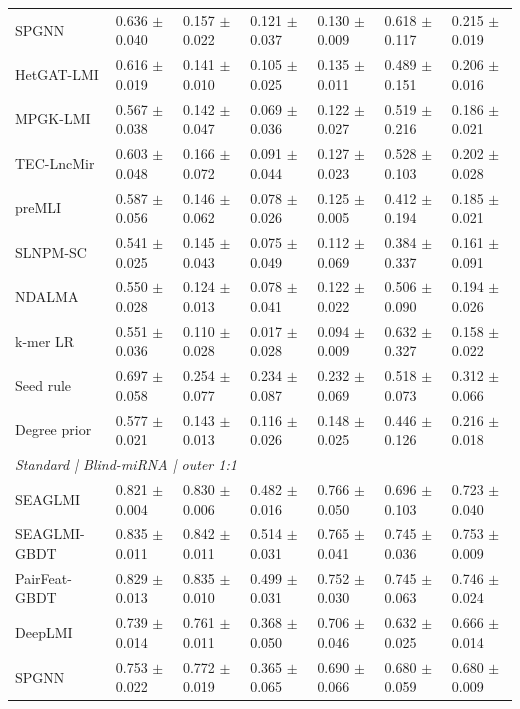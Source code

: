 \begin{landscape}
{\begin{longtable}{lllllll}
SPGNN & 0.636 $\pm$ 0.040 & 0.157 $\pm$ 0.022 & 0.121 $\pm$ 0.037 & 0.130 $\pm$ 0.009 & 0.618 $\pm$ 0.117 & 0.215 $\pm$ 0.019 \\
HetGAT-LMI & 0.616 $\pm$ 0.019 & 0.141 $\pm$ 0.010 & 0.105 $\pm$ 0.025 & 0.135 $\pm$ 0.011 & 0.489 $\pm$ 0.151 & 0.206 $\pm$ 0.016 \\
MPGK-LMI & 0.567 $\pm$ 0.038 & 0.142 $\pm$ 0.047 & 0.069 $\pm$ 0.036 & 0.122 $\pm$ 0.027 & 0.519 $\pm$ 0.216 & 0.186 $\pm$ 0.021 \\
TEC-LncMir & 0.603 $\pm$ 0.048 & 0.166 $\pm$ 0.072 & 0.091 $\pm$ 0.044 & 0.127 $\pm$ 0.023 & 0.528 $\pm$ 0.103 & 0.202 $\pm$ 0.028 \\
preMLI & 0.587 $\pm$ 0.056 & 0.146 $\pm$ 0.062 & 0.078 $\pm$ 0.026 & 0.125 $\pm$ 0.005 & 0.412 $\pm$ 0.194 & 0.185 $\pm$ 0.021 \\
SLNPM-SC & 0.541 $\pm$ 0.025 & 0.145 $\pm$ 0.043 & 0.075 $\pm$ 0.049 & 0.112 $\pm$ 0.069 & 0.384 $\pm$ 0.337 & 0.161 $\pm$ 0.091 \\
NDALMA & 0.550 $\pm$ 0.028 & 0.124 $\pm$ 0.013 & 0.078 $\pm$ 0.041 & 0.122 $\pm$ 0.022 & 0.506 $\pm$ 0.090 & 0.194 $\pm$ 0.026 \\
k-mer LR & 0.551 $\pm$ 0.036 & 0.110 $\pm$ 0.028 & 0.017 $\pm$ 0.028 & 0.094 $\pm$ 0.009 & 0.632 $\pm$ 0.327 & 0.158 $\pm$ 0.022 \\
Seed rule & 0.697 $\pm$ 0.058 & 0.254 $\pm$ 0.077 & 0.234 $\pm$ 0.087 & 0.232 $\pm$ 0.069 & 0.518 $\pm$ 0.073 & 0.312 $\pm$ 0.066 \\
Degree prior & 0.577 $\pm$ 0.021 & 0.143 $\pm$ 0.013 & 0.116 $\pm$ 0.026 & 0.148 $\pm$ 0.025 & 0.446 $\pm$ 0.126 & 0.216 $\pm$ 0.018 \\
\multicolumn{7}{l}{\textit{Standard | Blind-miRNA | outer 1:1}}\\
SEAGLMI & 0.821 $\pm$ 0.004 & 0.830 $\pm$ 0.006 & 0.482 $\pm$ 0.016 & 0.766 $\pm$ 0.050 & 0.696 $\pm$ 0.103 & 0.723 $\pm$ 0.040 \\
SEAGLMI-GBDT & 0.835 $\pm$ 0.011 & 0.842 $\pm$ 0.011 & 0.514 $\pm$ 0.031 & 0.765 $\pm$ 0.041 & 0.745 $\pm$ 0.036 & 0.753 $\pm$ 0.009 \\
PairFeat-GBDT & 0.829 $\pm$ 0.013 & 0.835 $\pm$ 0.010 & 0.499 $\pm$ 0.031 & 0.752 $\pm$ 0.030 & 0.745 $\pm$ 0.063 & 0.746 $\pm$ 0.024 \\
DeepLMI & 0.739 $\pm$ 0.014 & 0.761 $\pm$ 0.011 & 0.368 $\pm$ 0.050 & 0.706 $\pm$ 0.046 & 0.632 $\pm$ 0.025 & 0.666 $\pm$ 0.014 \\
SPGNN & 0.753 $\pm$ 0.022 & 0.772 $\pm$ 0.019 & 0.365 $\pm$ 0.065 & 0.690 $\pm$ 0.066 & 0.680 $\pm$ 0.059 & 0.680 $\pm$ 0.009 \\

\end{longtable}}
\end{landscape}
